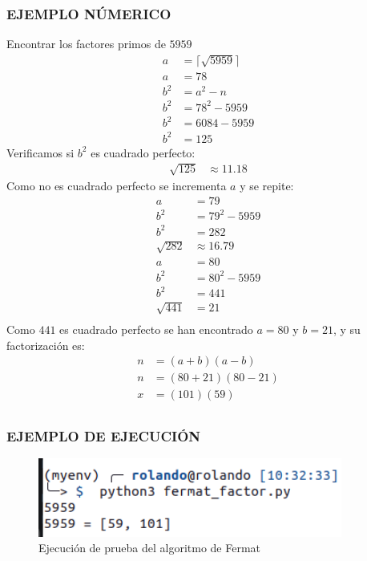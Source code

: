 \subsubsection{EJEMPLO NÚMERICO}
    Encontrar los factores primos de $5959$
    \begin{align*}
        a &= \lceil \sqrt{5959} \rceil \\
        a &= 78\\
        b^2 &= a^2 - n\\
        b^2 &= 78^2 - 5959\\
        b^2 &= 6084 - 5959\\
        b^2 &= 125
    \end{align*}
    Verificamos si $b^2$ es cuadrado perfecto:
    \begin{align*}
        \sqrt{125} & \approx 11.18 
    \end{align*}
    Como no es cuadrado perfecto se incrementa $a$ y se repite:
    \begin{align*}
        a &= 79\\
        b^2 &= 79^2 - 5959\\
        b^2 &= 282 \\
        \sqrt{282} &\approx 16.79 \\
        a &= 80\\
        b^2 &= 80^2 - 5959\\
        b^2 &= 441 \\
        \sqrt{441} &= 21 \\
    \end{align*}
    Como $441$ es cuadrado perfecto se han encontrado $a=80$ y $b=21$, y su factorización es:
    \begin{align*} 
        n &=  (a+b)(a-b)\\ 
        n &=  (80+21)(80-21)\\
        x &=  (101)(59)\\
    \end{align*}

    \subsubsection{EJEMPLO DE EJECUCIÓN}
    \begin{figure}[H]
        \centering
        \includegraphics[width=10cm]{images/fermat_prueba.png}
        \caption{Ejecución de prueba del algoritmo de Fermat}
    \end{figure}

